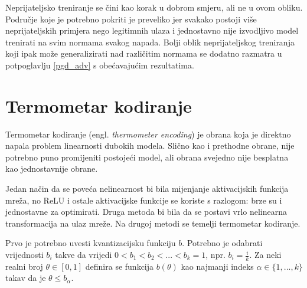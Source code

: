 \documentclass[utf8, diplomski]{fer}
\begin{document}
Neprijateljsko treniranje se čini kao korak u dobrom smjeru, ali ne u ovom obliku. Područje koje je potrebno pokriti je preveliko jer svakako postoji više neprijateljskih primjera nego legitimnih ulaza i jednostavno nije izvodljivo model trenirati na svim normama svakog napada. Bolji oblik neprijateljskog treniranja koji ipak može generalizirati nad različitim normama se dodatno razmatra u potpoglavlju \ref{pgd_adv} s obećavajućim rezultatima.

\section{Termometar kodiranje}\label{thermometer}
Termometar kodiranje (engl. \textit{thermometer encoding}) je obrana koja je direktno napala problem linearnosti dubokih modela\citep{thermometer_encoding}. Slično kao i prethodne obrane, nije potrebno puno promijeniti postojeći model, ali obrana svejedno nije besplatna kao jednostavnije obrane. \par
Jedan način da se poveća nelinearnost bi bila mijenjanje aktivacijskih funkcija mreža, no ReLU i ostale aktivacijske funkcije se koriste s razlogom: brze su i jednostavne za optimirati. Druga metoda bi bila da se postavi vrlo nelinearna transformacija na ulaz mreže. Na drugoj metodi se temelji termometar kodiranje. \par
Prvo je potrebno uvesti kvantizacijsku funkciju $b$. Potrebno je odabrati vrijednosti $b_{i}$ takve da vrijedi $0 < b_{1} < b_{2} < ... < b_{k} = 1$, npr. $b_{i} = \frac{i}{k}$. Za neki realni broj $\theta \in [0, 1]$ definira se funkcija $b(\theta)$ kao najmanji indeks $\alpha \in \{1, ..., k\}$ takav da je $\theta \leq b_{\alpha}$. \\
\end{document}
